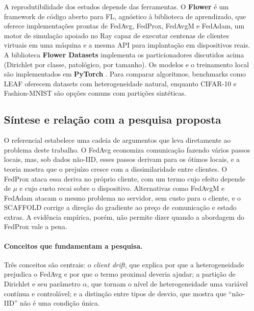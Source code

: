 A reprodutibilidade dos estudos depende das ferramentas. O \textbf{Flower} \citep{beutel2020flower} é um framework de código aberto para FL, agnóstico à biblioteca de aprendizado, que oferece implementações prontas de FedAvg, FedProx, FedAvgM e FedAdam, um motor de simulação apoiado no Ray \citep{moritz2018ray} capaz de executar centenas de clientes virtuais em uma máquina e a mesma API para implantação em dispositivos reais. A biblioteca \textbf{Flower Datasets} implementa os particionadores discutidos acima (Dirichlet por classe, patológico, por tamanho). Os modelos e o treinamento local são implementados em \textbf{PyTorch} \citep{paszke2019pytorch}. Para comparar algoritmos, benchmarks como LEAF \citep{caldas2018leaf} oferecem datasets com heterogeneidade natural, enquanto CIFAR-10 \citep{krizhevsky2009cifar} e Fashion-MNIST \citep{xiao2017fashion} são opções comuns com partições sintéticas.

\subsection{Síntese e relação com a pesquisa proposta}
\label{ref:sintese}

O referencial estabelece uma cadeia de argumentos que leva diretamente ao problema deste trabalho. O FedAvg economiza comunicação fazendo vários passos locais, mas, sob dados não-IID, esses passos derivam para os ótimos locais, e a teoria mostra que o prejuízo cresce com a dissimilaridade entre clientes. O FedProx ataca essa deriva no próprio cliente, com um termo cujo efeito depende de $\mu$ e cujo custo recai sobre o dispositivo. Alternativas como FedAvgM e FedAdam atacam o mesmo problema no servidor, sem custo para o cliente, e o SCAFFOLD corrige a direção do gradiente ao preço de comunicação e estado extras. A evidência empírica, porém, não permite dizer quando a abordagem do FedProx vale a pena.

\paragraph{Conceitos que fundamentam a pesquisa.} Três conceitos são centrais: o \textit{client drift}, que explica por que a heterogeneidade prejudica o FedAvg e por que o termo proximal deveria ajudar; a partição de Dirichlet e seu parâmetro $\alpha$, que tornam o nível de heterogeneidade uma variável contínua e controlável; e a distinção entre tipos de desvio, que mostra que ``não-IID'' não é uma condição única.

